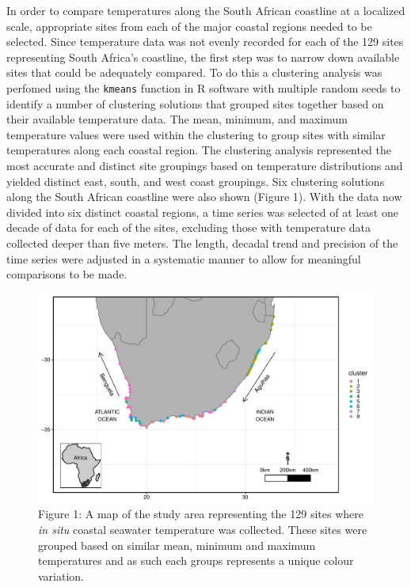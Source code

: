 \documentclass[12pt,]{article}
\begin{document}
In order to compare temperatures along the South African coastline at a
localized scale, appropriate sites from each of the major coastal
regions needed to be selected. Since temperature data was not evenly
recorded for each of the 129 sites representing South Africa's
coastline, the first step was to narrow down available sites that could
be adequately compared. To do this a clustering analysis was perfomed
using the \texttt{kmeans} function in R software with multiple random
seeds to identify a number of clustering solutions that grouped sites
together based on their available temperature data. The mean, minimum,
and maximum temperature values were used within the clustering to group
sites with similar temperatures along each coastal region. The
clustering analysis represented the most accurate and distinct site
groupings based on temperature distributions and yielded distinct east,
south, and west coast groupings. Six clustering solutions along the
South African coastline were also shown (Figure 1). With the data now
divided into six distinct coastal regions, a time series was selected of
at least one decade of data for each of the sites, excluding those with
temperature data collected deeper than five meters. The length, decadal
trend and precision of the time series were adjusted in a systematic
manner to allow for meaningful comparisons to be made.

\begin{figure}
\centering
\includegraphics{figures/map_fixed.pdf}
\caption{Figure 1: A map of the study area representing the 129 sites
where \emph{in situ} coastal seawater temperature was collected. These
sites were grouped based on similar mean, minimum and maximum
temperatures and as such each groups represents a unique colour
variation.}
\end{figure}
\end{document}
